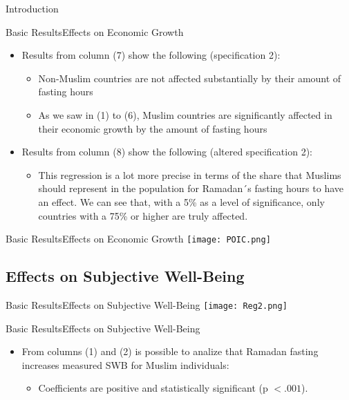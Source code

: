 \documentclass[pdftex,12pt,xcolor=pdftex,table]{beamer}
\begin{document}
\begin{frame}{Introduction}
    \begin{frame}{Basic Results}{Effects on Economic Growth}
    \begin{itemize}
        \item Results from column (7) show the following (specification 2):
        \begin{itemize}
            \item<2-> Non-Muslim countries are not affected substantially by their amount of fasting hours
            \item<3-> As we saw in (1) to (6), Muslim countries are significantly affected in their economic growth by the amount of fasting hours
        \end{itemize}
        \item<4-> Results from column (8) show the following (altered specification 2):
        \begin{itemize}
            \item<5-> This regression is a lot more precise in terms of the share that Muslims should represent in the population for Ramadan´s fasting hours to have an effect. We can see that, with a 5\% as a level of significance, only countries with a 75\% or higher are truly affected.
        \end{itemize}
    \end{itemize}
    \end{frame}
    
    \begin{frame}{Basic Results}{Effects on Economic Growth}
    \centering\texttt{[image: POIC.png]}
    \end{frame}
    
\subsection{Effects on Subjective Well-Being}
    \begin{frame}{Basic Results}{Effects on Subjective Well-Being}
    \vspace{-0.57cm}
    \centering\texttt{[image: Reg2.png]}
    \end{frame}
    
   \begin{frame}{Basic Results}{Effects on Subjective Well-Being}
     \begin{itemize}
        \item From columns (1) and (2) is possible to analize that Ramadan fasting increases measured SWB for Muslim individuals:
        \begin{itemize}
            \item<2-> Coefficients are positive and statistically significant (p $< .001$).
            

\end{itemize}
\end{itemize}
\end{frame}
\end{frame}
\end{document}
